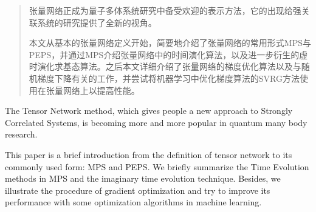 

\begin{abstract}
  张量网络正成为量子多体系统研究中备受欢迎的表示方法，它的出现给强关联系统的研究提供了全新的视角。
  
  本文从基本的张量网络定义开始，简要地介绍了张量网络的常用形式MPS与PEPS，并通过MPS介绍张量网络中的时间演化算法，以及进一步衍生的虚时演化求基态算法。之后本文详细介绍了张量网络的梯度优化算法以及与随机梯度下降有关的工作，并尝试将机器学习中优化梯度算法的SVRG方法使用在张量网络上以提高性能。
  
\end{abstract}

\begin{abstract*}
  The Tensor Network method, which gives people a new approach to Strongly Correlated Systems, is becoming more and more popular in quantum many body research.
  
  This paper is a brief introduction from the definition of tensor network to its commonly used form: MPS and PEPS. We briefly summarize the Time Evolution methods in MPS and the imaginary time evolution technique. Besides, we illustrate the procedure of gradient optimization and try to improve its performance with some optimization algorithms in machine learning.

\end{abstract*}
